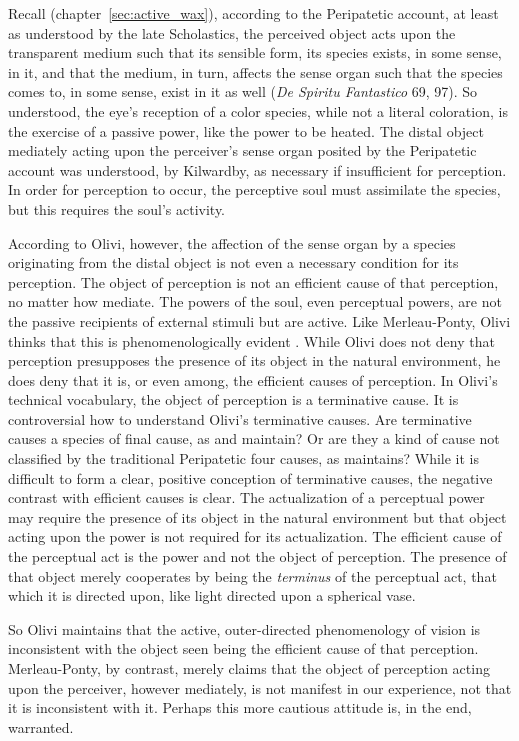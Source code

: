 Recall (chapter~\ref{sec:active_wax}), according to the Peripatetic account, at least as understood by the late Scholastics, the perceived object acts upon the transparent medium such that its sensible form, its species exists, in some sense, in it, and that the medium, in turn, affects the sense organ such that the species comes to, in some sense, exist in it as well (\emph{De Spiritu Fantastico} 69, 97). So understood, the eye's reception of a color species, while not a literal coloration, is the exercise of a passive power, like the power to be heated. The distal object mediately acting upon the perceiver's sense organ posited by the Peripatetic account was understood, by Kilwardby, as necessary if insufficient for perception. In order for perception to occur, the perceptive soul must assimilate the species, but this requires the soul's activity. 

According to Olivi, however, the affection of the sense organ by a species originating from the distal object is not even a necessary condition for its perception. The object of perception is not an efficient cause of that perception, no matter how mediate. The powers of the soul, even perceptual powers, are not the passive recipients of external stimuli but are active. Like Merleau-Ponty, Olivi thinks that this is phenomenologically evident \citep[143]{Toivanen:2013ul}. While Olivi does not deny that perception presupposes the presence of its object in the natural environment, he does deny that it is, or even among, the efficient causes of perception. In Olivi's technical vocabulary, the object of perception is a terminative cause. It is controversial how to understand Olivi's terminative causes. Are terminative causes a species of final cause, as \citet[192--195]{Kent:1984zm} and \citet{Pasnau:1999kn} maintain? Or are they a kind of cause not classified by the traditional Peripatetic four causes, as \citet[chapter 6]{Toivanen:2013ul} maintains? While it is difficult to form a clear, positive conception of terminative causes, the negative contrast with efficient causes is clear. The actualization of a perceptual power may require the presence of its object in the natural environment but that object acting upon the power is not required for its actualization. The efficient cause of the perceptual act is the power and not the object of perception. The presence of that object merely cooperates by being the \emph{terminus} of the perceptual act, that which it is directed upon, like light directed upon a spherical vase.

So Olivi maintains that the active, outer-directed phenomenology of vision is inconsistent with the object seen being the efficient cause of that perception. Merleau-Ponty, by contrast, merely claims that the object of perception acting upon the perceiver, however mediately, is not manifest in our experience, not that it is inconsistent with it. Perhaps this more cautious attitude is, in the end, warranted. 

